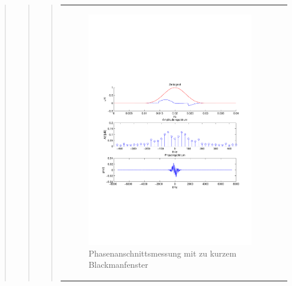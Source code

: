 \begin{quote}
\begin{quote}
\begin{quote}
\begin{center}
\begin{tabular}{ll}
\begin{minipage}{0.6\textwidth}
                    \end{minipage}
                    \begin{minipage}{0.6\textwidth}
    
                         \begin{figure}[H]
                            \label{fig:}
                            \includegraphics[scale=0.4, trim = 1.5cm 7cm 1.5cm 8cm,
                            clip]{./Bilder/Phasenanschnittsmessungmitblackmanfensterleckeffekt} %
                            \caption{Phasenanschnittsmessung mit zu kurzem Blackmanfenster}
                        \end{figure}
                   \vspace{-1.5em}
    
                    \end{minipage}
    

\end{tabular}
\end{center}
\end{quote}
\end{quote}
\end{quote}
